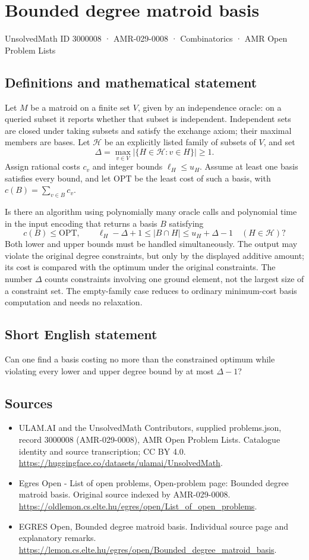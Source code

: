 \documentclass[11pt,a4paper]{article}
\begin{document}
\section*{Bounded degree matroid basis}\label{3000008}
{\small UnsolvedMath ID 3000008 · AMR-029-0008 · Combinatorics · AMR Open Problem Lists}
\subsection{Definitions and mathematical statement}
Let $M$ be a matroid on a finite set $V$, given by an independence oracle:
on a queried subset it reports whether that subset is independent.
Independent sets are closed under taking subsets and satisfy the exchange
axiom; their maximal members are bases. Let $\mathcal H$ be an explicitly
listed family of subsets of $V$, and set
\[
       \Delta=\max_{v\in V}|\{H\in\mathcal H:v\in H\}|\ge1.
\]
Assign rational costs $c_v$ and integer bounds $\ell_H\le u_H$.
Assume at least one basis satisfies every bound, and let $\mathrm{OPT}$
be the least cost of such a basis, with $c(B)=\sum_{v\in B}c_v$.

Is there an algorithm using polynomially many oracle calls and polynomial
time in the input encoding that returns a basis $B$ satisfying
\[
 c(B)\le\mathrm{OPT},\qquad
 \ell_H-\Delta+1\le |B\cap H|\le u_H+\Delta-1
                       \quad(H\in\mathcal H)?
\]
Both lower and upper bounds must be handled simultaneously. The output
may violate the original degree constraints, but only by the displayed
additive amount; its cost is compared with the optimum under the original
constraints. The number $\Delta$ counts constraints involving one ground
element, not the largest size of a constraint set. The empty-family case
reduces to ordinary minimum-cost basis computation and needs no relaxation.
\subsection{Short English statement}
Can one find a basis costing no more than the constrained optimum
while violating every lower and upper degree bound by at most $\Delta-1$?
\subsection{Sources}
\begin{itemize}
\item[S1] ULAM.AI and the UnsolvedMath Contributors, supplied problems.json, record 3000008 (AMR-029-0008), AMR Open Problem Lists. Catalogue identity and source transcription; CC BY 4.0.
\url{https://huggingface.co/datasets/ulamai/UnsolvedMath}.
\item[S2] Egres Open - List of open problems, Open-problem page: Bounded degree matroid basis. Original source indexed by AMR-029-0008.
\url{https://oldlemon.cs.elte.hu/egres/open/List_of_open_problems}.
\item[S3] EGRES Open, Bounded degree matroid basis. Individual source page and explanatory remarks.
\url{https://lemon.cs.elte.hu/egres/open/Bounded_degree_matroid_basis}.
\end{itemize}
\end{document}
